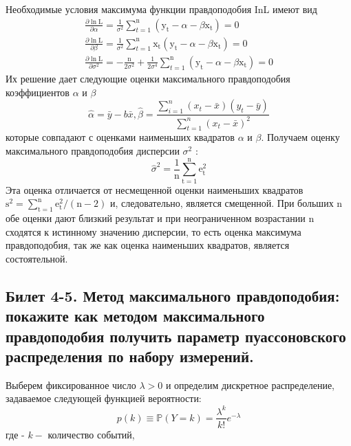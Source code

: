 \documentclass[a4paper, 12pt]{article}
\begin{document}
Необходимые условия максимума функции правдоподобия InL имеют вид
$$
\begin{array}{c}
	\frac{\partial \ln \mathrm{L}}{\partial \alpha}=\frac{1}{\sigma^{2}} \sum_{t=1}^{\mathrm{n}}\left(\mathrm{y}_{\mathrm{t}}-\alpha-\beta \mathrm{x}_{\mathrm{t}}\right)=0 \\
	\frac{\partial \ln \mathrm{L}}{\partial \beta}=\frac{1}{\sigma^{2}} \sum_{t=1}^{\mathrm{n}} \mathrm{x}_{\mathrm{t}}\left(\mathrm{y}_{\mathrm{t}}-\alpha-\beta \mathrm{x}_{\mathrm{t}}\right)=0 \\
	\frac{\partial \ln \mathrm{L}}{\partial \sigma^{2}}=-\frac{\mathrm{n}}{2 \sigma^{2}}+\frac{1}{2 \sigma^{4}} \sum_{t=1}^{\mathrm{n}}\left(\mathrm{y}_{\mathrm{t}}-\alpha-\beta \mathrm{x}_{\mathrm{t}}\right)=0
\end{array}
$$ Их решение дает следующие оценки максимального правдоподобия коэффициентов $\alpha$ и $\beta$
$$
\widehat{\alpha}=\bar{y}-b \bar{x}, \widehat{\beta}=\frac{\sum_{i=1}^{n}\left(x_{t}-\bar{x}\right)\left(y_{t}-\bar{y}\right)}{\sum_{t=1}^{n}\left(x_{t}-\bar{x}\right)^{2}}
$$
которые совпадают с оценками наименьших квадратов $\alpha$ и $\beta$. Получаем оценку максимального правдоподобия дисперсии $\sigma^{2}$ :
$$
\widehat{\sigma}^{2}=\frac{1}{\mathrm{n}} \sum_{\mathrm{t}=1}^{\mathrm{n}} \mathrm{e}_{\mathrm{t}}^{2}
$$
Эта оценка отличается от несмещенной оценки наименьших квадратов $\mathrm{s}^{2}=\sum_{\mathrm{t}=1}^{\mathrm{n}} \mathrm{e}_{\mathrm{t}}^{2} /(\mathrm{n}-2)$ и, следовательно, является смещенной. При больших $\mathrm{n}$ обе оценки дают близкий результат и при неограниченном возрастании n сходятся к истинному значению дисперсии, то есть оценка максимума правдоподобия, так же как оценка наименьших квадратов, является состоятельной.


	\subsection*{Билет 4-5. Метод максимального правдоподобия: покажите как методом максимального  правдоподобия получить параметр пуассоновского распределения по набору измерений.}
	Выберем фиксированное число $\lambda>0$ и определим дискретное распределение, задаваемое следующей функцией вероятности:
	$$
	p(k) \equiv \mathbb{P}(Y=k)=\frac{\lambda^{k}}{k !} e^{-\lambda}
	$$
	где
	- $k-$ количество событий,
	
\end{document}
